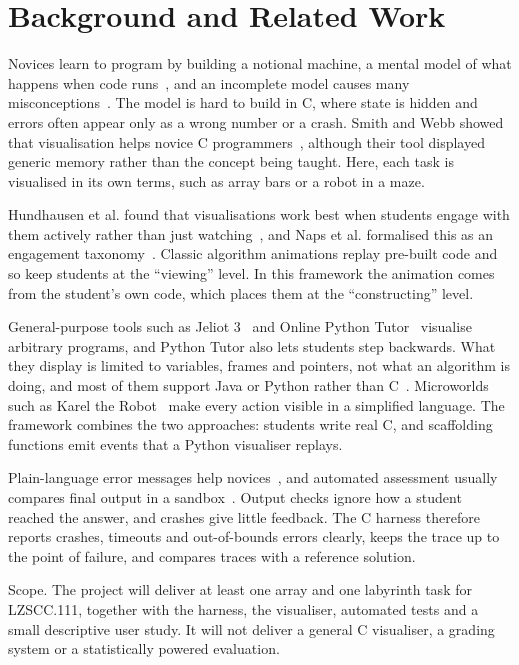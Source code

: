 \documentclass[11pt,a4paper]{article}
\begin{document}
\section{Background and Related Work}\label{sec:background}

Novices learn to program by building a notional machine, a mental model of what happens when code runs~\cite{fincher2020notional}, and an incomplete model causes many misconceptions~\cite{sorva2013notional}. The model is hard to build in C, where state is hidden and errors often appear only as a wrong number or a crash. Smith and Webb showed that visualisation helps novice C programmers~\cite{smith2000efficacy}, although their tool displayed generic memory rather than the concept being taught. Here, each task is visualised in its own terms, such as array bars or a robot in a maze.

Hundhausen et al. found that visualisations work best when students engage with them actively rather than just watching~\cite{hundhausen2002meta}, and Naps et al. formalised this as an engagement taxonomy~\cite{naps2002exploring}. Classic algorithm animations replay pre-built code and so keep students at the “viewing” level. In this framework the animation comes from the student’s own code, which places them at the “constructing” level.

General-purpose tools such as Jeliot 3~\cite{moreno2004} and Online Python Tutor~\cite{guo2013pythontutor} visualise arbitrary programs, and Python Tutor also lets students step backwards. What they display is limited to variables, frames and pointers, not what an algorithm is doing, and most of them support Java or Python rather than C~\cite{sorva2013review}. Microworlds such as Karel the Robot~\cite{pattis1981} make every action visible in a simplified language. The framework combines the two approaches: students write real C, and scaffolding functions emit events that a Python visualiser replays.

Plain-language error messages help novices~\cite{becker2016}, and automated assessment usually compares final output in a sandbox~\cite{ihantola2010review}. Output checks ignore how a student reached the answer, and crashes give little feedback. The C harness therefore reports crashes, timeouts and out-of-bounds errors clearly, keeps the trace up to the point of failure, and compares traces with a reference solution.

Scope. The project will deliver at least one array and one labyrinth task for LZSCC.111, together with the harness, the visualiser, automated tests and a small descriptive user study. It will not deliver a general C visualiser, a grading system or a statistically powered evaluation.
\end{document}
